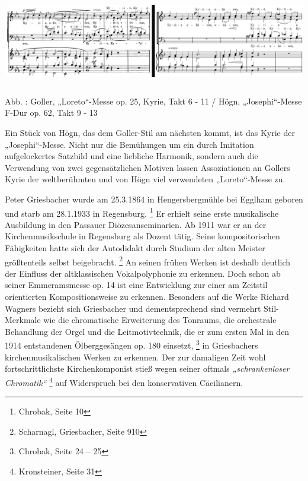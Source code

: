 \includegraphics[width=15.977cm,height=3.87cm]{pictures/zulassungsarbeit-img090.png}

Abb. : Goller, „Loreto“-Messe op. 25, Kyrie,
Takt 6 - 11 / Högn, „Josephi“-Messe F-Dur op. 62, Takt 9 - 13

Ein Stück von Högn, das dem Goller-Stil am nächsten kommt, ist das Kyrie
der „Josephi“-Messe. Nicht nur die Bemühungen um ein durch Imitation
aufgelockertes Satzbild und eine liebliche Harmonik, sondern auch die
Verwendung von zwei gegensätzlichen Motiven lassen Assoziationen an
Gollers Kyrie der weltberühmten und von Högn viel verwendeten
„Loreto“-Messe zu.

Peter Griesbacher wurde am 25.3.1864 in Hengersbergmühle bei Egglham
geboren und starb am 28.1.1933 in Regensburg. \footnote{Chrobak, Seite
10} Er erhielt seine erste musikalische Ausbildung in den Passauer
Diözesanseminarien. Ab 1911 war er an der Kirchenmusikschule in
Regensburg als Dozent tätig. Seine kompositorischen Fähigkeiten hatte
sich der Autodidakt durch Studium der alten Meister größtenteils selbst
beigebracht. \footnote{Scharnagl, Griesbacher, Seite 910} An seinen
frühen Werken ist deshalb deutlich der Einfluss der altklassischen
Vokalpolyphonie zu erkennen. Doch schon ab seiner Emmeramsmesse op. 14
ist eine Entwicklung zur einer am Zeitstil orientierten
Kompositionsweise zu erkennen. Besonders auf die Werke Richard Wagners
bezieht sich Griesbacher und dementsprechend sind vermehrt
Stil-Merkmale wie die chromatische Erweiterung des Tonraums, die
orchestrale Behandlung der Orgel und die Leitmotivtechnik, die er zum
ersten Mal in den 1914 entstandenen Ölberggesängen op. 180
einsetzt, \footnote{Chrobak, Seite 24 – 25} in Griesbachers
kirchenmusikalischen Werken zu erkennen. Der zur damaligen Zeit wohl
fortschrittlichste Kirchenkomponist stieß wegen seiner oftmals
\textit{„schrankenloser Chromatik“ } \footnote{Kronsteiner, Seite 31}
auf Widerspruch bei den konservativen Cäcilianern.


